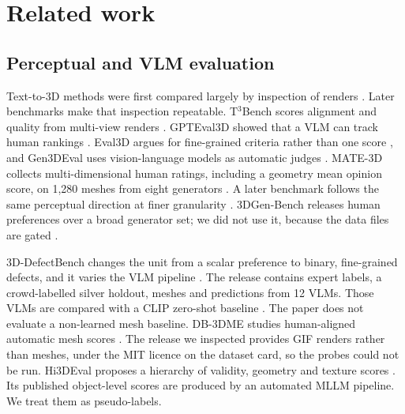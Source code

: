 \section{Related work}
\label{sec:related}

\subsection{Perceptual and VLM evaluation}
Text-to-3D methods were first compared largely by inspection of renders \citep{poole2022dreamfusion,lin2023magic3d,wang2023sjc,metzer2022latentnerf,tsalicoglou2023textmesh}.
Later benchmarks make that inspection repeatable.
T$^3$Bench scores alignment and quality from multi-view renders \citep{he2023t3bench}.
GPTEval3D showed that a VLM can track human rankings \citep{wu2024gpteval3d}.
Eval3D argues for fine-grained criteria rather than one score \citep{duggal2025eval3d}, and Gen3DEval uses vision-language models as automatic judges \citep{maiti2025gen3deval}.
MATE-3D collects multi-dimensional human ratings, including a geometry mean opinion score, on 1{,}280 meshes from eight generators \citep{zhang2025mate3d}.
A later benchmark follows the same perceptual direction at finer granularity \citep{cui2025fine}.
3DGen-Bench releases human preferences over a broad generator set; we did not use it, because the data files are gated \citep{zhang2025gen3dbench}.

3D-DefectBench changes the unit from a scalar preference to binary, fine-grained defects, and it varies the VLM pipeline \citep{zhao2026defectbench}.
The release contains expert labels, a crowd-labelled silver holdout, meshes and predictions from 12 VLMs.
Those VLMs are compared with a CLIP zero-shot baseline \citep{radford2021clip}.
The paper does not evaluate a non-learned mesh baseline.
DB-3DME studies human-aligned automatic mesh scores \citep{jia2026db3dme}.
The release we inspected provides GIF renders rather than meshes, under the MIT licence on the dataset card, so the probes could not be run.
Hi3DEval proposes a hierarchy of validity, geometry and texture scores \citep{zhang2025hi3deval}.
Its published object-level scores are produced by an automated MLLM pipeline.
We treat them as pseudo-labels.

